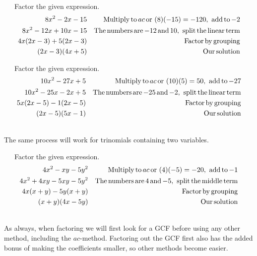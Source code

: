 \begin{example}~~~Factor the given expression.
  \begin{eqnarray*}
    8 x^2 - 2 x - 15 &  & \operatorname{Multiply} \operatorname{to} a c \operatorname{or~} (8) (- 15) =
    - 120, \operatorname{~add} \operatorname{to} - 2\\
    8 x^2 - 12 x + 10 x - 15 &  & \operatorname{The} \operatorname{numbers} \operatorname{are} - 12
    \operatorname{and} 10, \operatorname{~split} \operatorname{the} \operatorname{linear} \operatorname{term}\\
    4 x (2 x - 3) + 5 (2 x - 3) &  & \operatorname{Factor} \operatorname{by} \operatorname{grouping}\\
    (2 x - 3) (4 x + 5) &  & \operatorname{Our} \operatorname{solution}
  \end{eqnarray*}
\end{example}
\begin{example}~~~Factor the given expression.
  \begin{eqnarray*}
    10 x^2 - 27 x + 5 &  & \operatorname{Multiply} \operatorname{to} a c \operatorname{or~} (10) (5) =
    50, \operatorname{~add} \operatorname{to} - 27\\
    10 x^2 - 25 x - 2 x + 5 &  & \operatorname{The} \operatorname{numbers} \operatorname{are} - 25
    \operatorname{and} - 2, \operatorname{~split} \operatorname{the} \operatorname{linear} \operatorname{term}\\
    5 x (2 x - 5) - 1 (2 x - 5) &  & \operatorname{Factor} \operatorname{by} \operatorname{grouping}\\
    (2 x - 5) (5 x - 1) &  & \operatorname{Our} \operatorname{solution}
  \end{eqnarray*}
\end{example}
~\\
The same process will work for trinomials containing two variables.\\
\begin{example}~~~Factor the given expression.
  \begin{eqnarray*}
    4 x^2 - x y - 5 y^2 &  & \operatorname{Multiply} \operatorname{to} a c \operatorname{or~} (4) (- 5)
    = - 20, \operatorname{~add} \operatorname{to} - 1\\
    4 x^2 + 4 x y - 5 x y - 5 y^2 &  & \operatorname{The} \operatorname{numbers} \operatorname{are} 4
    \operatorname{and} - 5, \operatorname{~split} \operatorname{the} \operatorname{middle} \operatorname{term}\\
    4 x (x + y) - 5 y (x + y) &  & \operatorname{Factor} \operatorname{by} \operatorname{grouping}\\
    (x + y) (4 x - 5 y) &  & \operatorname{Our} \operatorname{solution}
  \end{eqnarray*}
\end{example}
~\\
As always, when factoring we will first look for a GCF before using any other
method, including the $ac$-method. Factoring out the GCF first also has the
added bonus of making the coefficients smaller, so other methods become easier.\\

